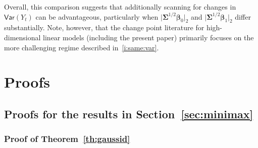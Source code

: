 \documentclass[11pt, a4paper]{article}
\newcommand{\Var}[0]{\mathsf{Var}}
\theoremstyle{definition}
\theoremstyle{definition}
\theoremstyle{definition}
\theoremstyle{definition}
\theoremstyle{definition}
\theoremstyle{remark}
\theoremstyle{definition}
\theoremstyle{definition}
\theoremstyle{definition}
\begin{document}
Overall, this comparison suggests that additionally scanning for changes in $\Var(Y_t)$ can be advantageous, particularly when $\lvert \bm\Sigma^{1/2}\bm\beta_0\rvert_2$ and $\lvert \bm\Sigma^{1/2}\bm\beta_1\rvert_2$ differ substantially. Note, however, that the change point literature for high-dimensional linear models (including the present paper) primarily focuses on the more challenging regime described in~\ref{i:same:var}.

\section{Proofs}

\subsection{Proofs for the results in Section~\ref{sec:minimax}}

\subsubsection{Proof of Theorem~\ref{th:gaussid}}
\end{document}
